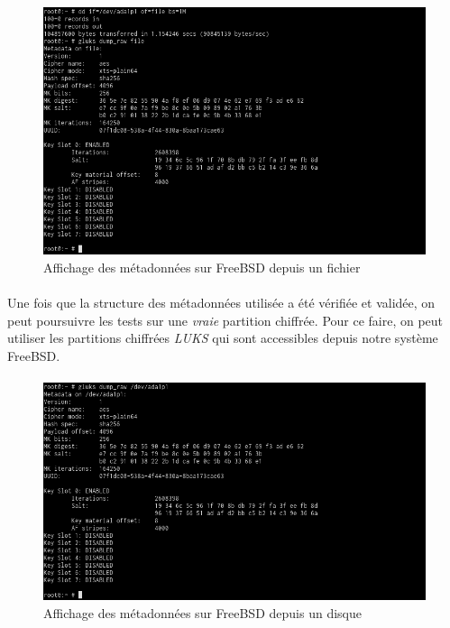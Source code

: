 \paragraph{}
\begin{figure}[h]
\centering
\includegraphics[width=.9\linewidth]{tests/freebsd_dump_file.png}
\caption{\label{fig:freebsd_dump_file}Affichage des métadonnées sur FreeBSD
  depuis un fichier}
\end{figure}

\paragraph{}
Une fois que la structure des métadonnées utilisée a été vérifiée et validée, on
peut poursuivre les tests sur une \textit{vraie} partition chiffrée. Pour ce
faire, on peut utiliser les partitions chiffrées \textit{LUKS} qui sont
accessibles depuis notre système FreeBSD.
\paragraph{}
\begin{figure}[h]
\centering
\includegraphics[width=.9\linewidth]{tests/freebsd_dump_disk.png}
\caption{\label{fig:freebsd_dump_disk}Affichage des métadonnées sur FreeBSD
  depuis un disque}
\end{figure}

